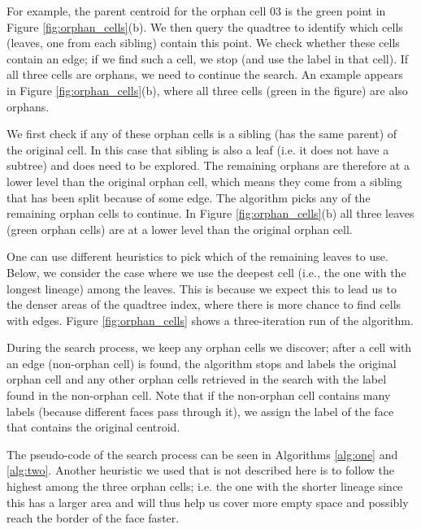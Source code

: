 For example, the parent centroid for the orphan cell 03 is the green point in Figure \ref{fig:orphan_cells}(b). We then query the quadtree to identify which cells (leaves, one from each sibling) contain this point. We check whether these cells contain an edge; if we find such a cell, we stop (and use the label in that cell). If all three cells are orphans, we need to continue the search. An example appears in Figure \ref{fig:orphan_cells}(b), where all three cells (green in the figure) are also orphans.

We first check if any of these orphan cells is a sibling (has the same parent) of the original cell. In this case that sibling is also a leaf (i.e. it does not have a subtree) and does need to be explored.  The remaining orphans are therefore at a lower level than the original orphan cell, which means they come from a sibling that has been split because of some edge. The algorithm picks any of the remaining orphan cells to continue. In Figure \ref{fig:orphan_cells}(b) all three leaves (green orphan cells) are at a lower level than the original orphan cell.

One can use different heuristics to pick which of the remaining leaves to use. Below, we consider the case where we use the deepest cell (i.e., the one with the longest lineage) among the leaves. This is because we expect this to lead us to the denser areas of the quadtree index, where there is more chance to find cells with edges. Figure \ref{fig:orphan_cells} shows a three-iteration run of the algorithm.

During the search process, we keep any orphan cells we discover; after a cell with an edge (non-orphan cell) is found, the algorithm stops and labels the original orphan cell and any other orphan cells retrieved in the search with the label found in the non-orphan cell. Note that if the non-orphan cell contains many labels (because different faces pass through it), we assign the label of the face that contains the original centroid.

The pseudo-code of the search process can be seen in Algorithms \ref{alg:one} and \ref{alg:two}. Another heuristic we used that is not described here is to follow the highest among the three orphan cells; i.e. the one with the shorter lineage since this has a larger area and will thus help us cover more empty space and possibly reach the border of the face faster.

